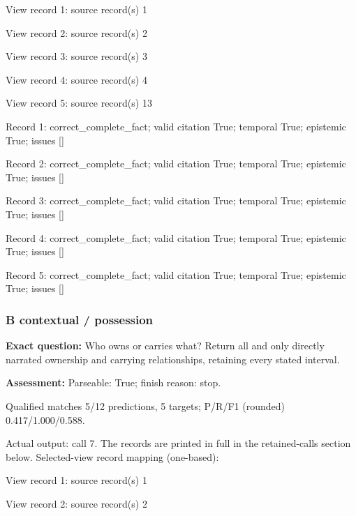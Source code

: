 View record 1: source record(s) 1\par

View record 2: source record(s) 2\par

View record 3: source record(s) 3\par

View record 4: source record(s) 4\par

View record 5: source record(s) 13\par

Record 1: correct\_complete\_fact; valid citation True; temporal True; epistemic True; issues []\par

Record 2: correct\_complete\_fact; valid citation True; temporal True; epistemic True; issues []\par

Record 3: correct\_complete\_fact; valid citation True; temporal True; epistemic True; issues []\par

Record 4: correct\_complete\_fact; valid citation True; temporal True; epistemic True; issues []\par

Record 5: correct\_complete\_fact; valid citation True; temporal True; epistemic True; issues []\par

\subsubsection*{B contextual / possession}

\noindent\textbf{Exact question:} Who owns or carries what? Return all and only directly narrated ownership and carrying relationships, retaining every stated interval.\par

\noindent\textbf{Assessment:} Parseable: True; finish reason: stop.

Qualified matches 5/12 predictions, 5 targets; P/R/F1 (rounded) 0.417/1.000/0.588.\par

Actual output: call 7. The records are printed in full in the retained-calls section below. Selected-view record mapping (one-based):

View record 1: source record(s) 1\par

View record 2: source record(s) 2\par

